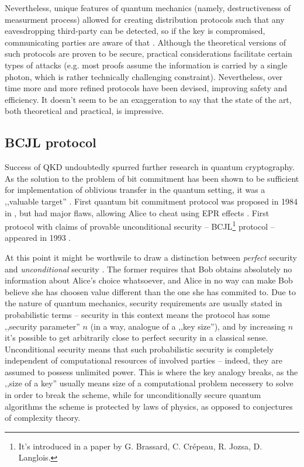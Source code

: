 \documentclass[10pt]{article}
\begin{document}
Nevertheless, unique features of quantum mechanics (namely, destructiveness of measurment process)
allowed  for creating distribution protocols such that any eavesdropping third-party can be detected,
so if the key is compromised, communicating parties are aware of that \cite{bb84}. Although the
theoretical versions of such protocols are proven to be secure, practical considerations facilitate
certain types of attacks (e.g. most proofs assume the information is carried by a single photon,
which is rather technically challenging constraint). Nevertheless, over time more and more refined
protocols have been devised, improving safety and efficiency. It doesn't seem to be an exaggeration 
to say that the state of the art, both theoretical and practical, is impressive.

\subsection*{BCJL protocol}

Success of QKD undoubtedly spurred further research in quantum cryptography. As the solution to the 
problem of bit commitment has been shown to be sufficient for implementation of oblivious transfer
in the quantum setting, it was a ,,valuable target'' \cite{Crepeau88,Bennet92}. First quantum bit
commitment protocol was proposed in 1984 in \cite{bb84}\footnotemark, but had major flaws, allowing
Alice to cheat using EPR effects \cite{bcjl93}. First protocol with claims of provable unconditional
security -- BCJL\footnote{It's introduced in a paper by G. Brassard, C. Cr\'{e}peau, R. Jozsa, 
D. Langlois.} protocol -- appeared in 1993 \cite{bcjl93}.


At this point it might be worthwile to draw a distinction between \emph{perfect} security and
\emph{unconditional} security \cite{Mayers97}. The former requires that Bob obtains absolutely no 
information about Alice's choice whatsoever, and Alice in no way can make Bob believe she has choosen 
value different than the one she has commited to. Due to the nature of quantum mechanics, security 
requirements are usually stated in probabilistic terms -- security in this context means the 
protocol has some ,,security parameter'' \(n\) (in a way, analogue of a ,,key size''), and by increasing
\(n\) it's possible to get arbitrarily close to perfect security in a classical sense. Unconditional
security means that such probabilistic security is completely independent of computational resources
of involved parties -- indeed, they are assumed to possess unlimited power. This is where the
key analogy breaks, as the ,,size of a key'' usually means size of a computational problem necessery
to solve in order to break the scheme, while for unconditionally secure quantum algorithms the
scheme is protected by laws of physics, as opposed to conjectures of complexity theory.
\end{document}
